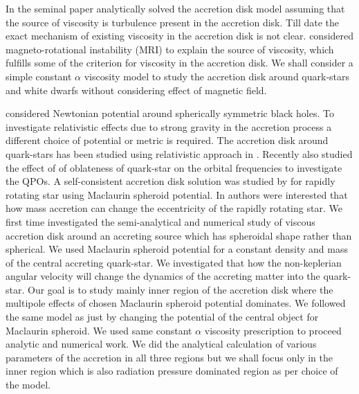 \documentclass[useAMS,usenatbib]{mn2e}
\begin{document}
In the seminal paper \citet{1973A&A....24..337S} analytically solved the accretion disk model assuming that the source of viscosity is turbulence present in the accretion disk. Till date the exact mechanism of existing viscosity in the accretion disk is not clear. \citet{1991ApJ...376..214B} considered magneto-rotational instability (MRI) to explain the source of viscosity, which fulfills some of the criterion for viscosity in the accretion disk. We shall consider a simple constant $\alpha$ viscosity model to study the accretion disk around quark-stars and white dwarfs without considering effect of magnetic field.

\citet{1973A&A....24..337S} considered Newtonian potential around spherically symmetric black holes. To investigate relativistic effects due to strong gravity in the accretion process a different choice of potential or metric is required. The accretion disk around quark-stars has been studied using relativistic approach in \citet{2009A&A...500..621K}. Recently \citet{2014arXiv1403.1129G} also studied the effect of of oblateness of quark-star on the orbital frequencies to investigate the QPOs. A self-consistent accretion disk solution was studied by \citet{1993A&A...274..796B} for rapidly rotating star using Maclaurin spheroid potential. In \citet{1993A&A...274..796B} authors were interested that how mass accretion can change the eccentricity of the rapidly rotating star. We first time investigated the semi-analytical and numerical study of viscous accretion disk around an accreting source which has spheroidal shape rather than spherical. We used Maclaurin spheroid potential for a constant density and mass of the central accreting quark-star. We investigated that how the non-keplerian angular velocity will change the dynamics of the accreting matter into the quark-star. Our goal is to study mainly inner region of the accretion disk where the multipole effects of chosen Maclaurin spheroid potential dominates. We followed the same model as \citet{1973A&A....24..337S} just by changing the potential of the central object for Maclaurin spheroid. We used same constant $\alpha$ viscosity prescription to proceed analytic and numerical work. We did the analytical calculation of various parameters of the accretion in all three regions but we shall focus only in the inner region which is also radiation pressure dominated region as per choice of the \citet{1973A&A....24..337S} model.
\end{document}
